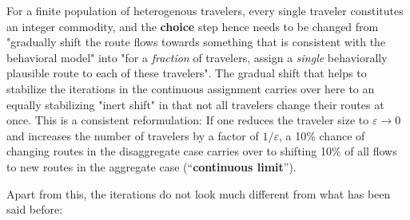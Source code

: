 
%

For a finite population of heterogenous travelers, every single
traveler constitutes an integer commodity, and the \textbf{choice}
step hence needs to be changed from "gradually shift the route flows
towards something that is consistent with the behavioral model" into
"for a \emph{fraction} of travelers, assign a \emph{single}
behaviorally plausible route to each of these travelers". The gradual shift that
helps to stabilize the iterations in the continuous assignment carries
over here to an equally stabilizing "inert shift" in that not all travelers
change their routes at once. This is a consistent reformulation: If
one reduces the traveler size to $\varepsilon \rightarrow 0$ and
increases the number of travelers by a factor of $1/\varepsilon$,
a 10\% chance of
changing routes in the disaggregate case carries over to shifting 10\%
of all flows to new routes in the aggregate case (``\textbf{continuous
limit}'').

Apart from this, the iterations do not look much different from what
has been said before:

